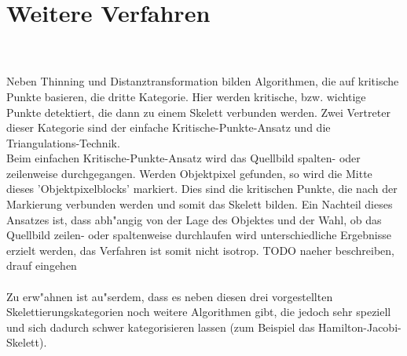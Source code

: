 \section{Weitere Verfahren}
\label{sec:weitere_verfahren}
\\ \\
Neben Thinning und Distanztransformation bilden Algorithmen, die auf kritische Punkte basieren, die dritte Kategorie. Hier werden kritische, bzw. wichtige Punkte detektiert, die dann zu einem Skelett verbunden werden. Zwei Vertreter dieser Kategorie sind der einfache Kritische-Punkte-Ansatz und die Triangulations-Technik. \\ 
Beim einfachen Kritische-Punkte-Ansatz wird das Quellbild spalten- oder zeilenweise durchgegangen. Werden Objektpixel gefunden, so wird die Mitte dieses 'Objektpixelblocks' markiert. Dies sind die kritischen Punkte, die nach der Markierung verbunden werden und somit das Skelett bilden. Ein Nachteil dieses Ansatzes ist, dass abh"angig von der Lage des Objektes und der Wahl, ob das Quellbild zeilen- oder spaltenweise durchlaufen wird unterschiedliche Ergebnisse erzielt werden, das Verfahren ist somit nicht isotrop.
TODO naeher beschreiben, drauf eingehen
\\ \\
Zu erw"ahnen ist au"serdem, dass es neben diesen drei vorgestellten Skelettierungskategorien noch weitere Algorithmen gibt, die jedoch sehr speziell und sich dadurch schwer kategorisieren lassen (zum Beispiel das Hamilton-Jacobi-Skelett).